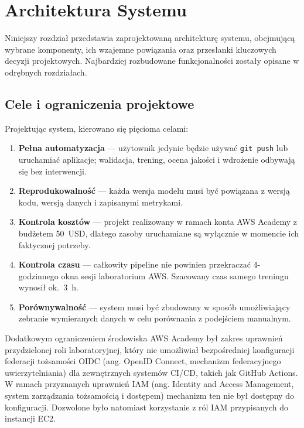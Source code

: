 \section{Architektura Systemu}
\label{sec:Architektura_systemu}

Niniejszy rozdział przedstawia zaprojektowaną architekturę systemu, obejmującą wybrane komponenty, ich wzajemne powiązania oraz przesłanki kluczowych decyzji projektowych. Najbardziej rozbudowane funkcjonalności zostały opisane w odrębnych rozdziałach.

\subsection{Cele i ograniczenia projektowe}

Projektując system, kierowano się pięcioma celami:

\begin{enumerate}
  \item \textbf{Pełna automatyzacja} --- użytownik jedynie będzie używać \texttt{git push} lub uruchamiać aplikacje; walidacja, trening, ocena jakości i wdrożenie odbywają się bez interwencji.
  \item \textbf{Reprodukowalność} --- każda wersja modelu musi być powiązana z wersją kodu, wersją danych i zapisanymi metrykami.
  \item \textbf{Kontrola kosztów} --- projekt realizowany w ramach konta AWS Academy z budżetem 50~USD, dlatego zasoby uruchamiane są wyłącznie w momencie ich faktycznej potrzeby. 
  \item \textbf{Kontrola czasu} --- całkowity pipeline nie powinien przekraczać 4-godzinnego okna sesji laboratorium AWS. Szacowany czas samego treningu wynosił ok.~3~h.
  \item \textbf{Porównywalność} --- system musi być zbudowany w sposób umożliwiający zebranie wymieranych danych w celu porównania z podejściem manualnym.
\end{enumerate}

Dodatkowym ograniczeniem środowiska AWS Academy był zakres uprawnień przydzielonej roli laboratoryjnej, który nie umożliwiał bezpośredniej konfiguracji federacji tożsamości OIDC (ang. OpenID Connect, mechanizm federacyjnego uwierzytelniania) dla zewnętrznych systemów CI/CD, takich jak GitHub Actions. W ramach przyznanych uprawnień IAM (ang. Identity and Access Management, system zarządzania tożsamością i dostępem) mechanizm ten nie był dostępny do konfiguracji. Dozwolone było natomiast korzystanie z ról IAM przypisanych do instancji EC2.

